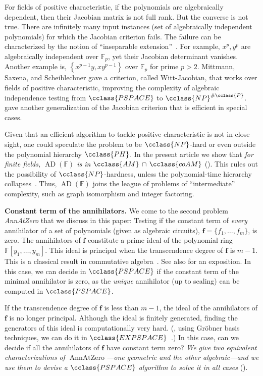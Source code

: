 \documentclass{toc}
\newcommand{\F}{\mathbb{F}}
\newcommand{\Pclass}{\cclass{P}\xspace}  %
\newcommand{\NP}{\cclass{NP}\xspace}  %
\newcommand{\AM}{\cclass{AM}\xspace}  %
\newcommand{\coAM}{\cclass{coAM}\xspace}  %
\newcommand{\AMcapcoAM}{\AM\,\cap\,\coAM}  %
\newcommand{\PSPACE}{\cclass{PSPACE}\xspace}  %
\newcommand{\EXPSPACE}{\cclass{EXPSPACE}\xspace} %
\newcommand{\PH}{\cclass{PH}\xspace}  %
\DeclareMathOperator{\AD}{\mathrm{AD}\xspace} %
\DeclareMathOperator{\AnnAtZero}{\mathrm{AnnAtZero}\xspace} %
\begin{document}
For fields of positive characteristic, if the polynomials are algebraically dependent, then their Jacobian matrix is not full rank.
But the converse is not true. There are infinitely many input instances (set of algebraically independent polynomials) for which the Jacobian criterion fails. The failure can be characterized by the notion of ``inseparable extension''~\cite{pandey2016algebraic}. For example, $x^p, y^p$ are algebraically independent over $\mathbb{F}_p$, yet their Jacobian determinant vanishes. Another example is, $\left\{ x^{p-1}y, xy^{p-1} \right\}$ over $\mathbb{F}_p$ for prime $p>2$. 
%
%
Mittmann, %
Saxena, and Scheiblechner  %
\cite{mittmann2014algebraic} gave a criterion, called Witt-Jacobian,
that works over fields of
%
%
%
%
positive characteristic,
improving the complexity of
%
%
algebraic independence testing  %
from $\PSPACE$ to
%
$\NP^{\#\Pclass}$.  %
\cite{pandey2016algebraic} gave another generalization of the
Jacobian criterion that is efficient in special cases.
 
Given that an efficient algorithm to tackle 
%
positive characteristic %
is not in close sight, one could speculate the problem to be $\NP$-hard or even outside the polynomial hierarchy 
%
$\PH$. %
In
%
the present article   %
we show
%
that \emph{for finite fields,
%
$\AD(\F)$   %
is in
%
$\AMcapcoAM$}   %
(). This rules out the possibility of
$\NP$-hardness, %
%
unless the polynomial-time hierarchy collapses~\cite{AB09}.
%
Thus,
%
$\AD(\F)$   %
joins the league of problems of ``intermediate'' complexity,
%
%
such as   %
graph isomorphism
%
and   %
integer factoring. 
 
 \smallskip\noindent
\textbf{Constant term of the annihilators.}
We come to the second problem
\emph{AnnAtZero}  %
that we discuss in this paper: Testing if the constant term of \emph{every}
%
annihilator    %
%
of a set  %
of polynomials
%
%
(given as algebraic circuits),
%
$\mathbf{f}=\{f_1,\ldots,f_m\}$, is zero. 
The annihilators of $\mathbf{f}$ constitute a prime ideal of the polynomial ring $\F[y_1,\ldots,y_m]$. This ideal is principal when the transcendence degree of  $\mathbf{f}$ is $m-1$. This is a classical result in commutative algebra~\cite[Theorem~47]{Mat80}. See also \cite[Lemma~7]{Kay09} for an exposition. In this case, we can decide
%
in $\PSPACE$  %
if the constant term of the minimal annihilator is zero,
%
as the \emph{unique} annihilator (up to scaling) can be computed in $\PSPACE$. 
 
If
the  %
transcendence degree of $\mathbf{f}$ is less than $m-1$, the ideal of the annihilators of $\mathbf{f}$ is no longer principal. Although the ideal is finitely generated, finding the generators of this ideal is computationally very hard. (\Eg, using Gr\"obner basis techniques, we can do it in
%
$\EXPSPACE$~\cite[Section~1.2.1]{derksen2015computational}.) In this case, can we decide if all the annihilators of $\mathbf{f}$ have constant term zero? \emph{We give two equivalent characterizations of $\AnnAtZero$---one geometric and the other
%
algebraic---and we use them to  %
devise a $\PSPACE$ algorithm to solve it in all cases} ().
 
\end{document}
